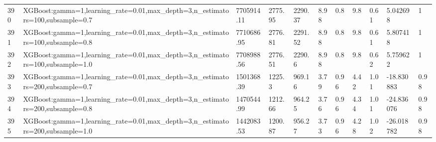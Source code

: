 \begin{longtable}{C{0.8cm} L{2cm} C{1.15cm} C{1.15cm} C{1.15cm} C{1.15cm} C{0.85cm} C{1.25cm} C{1.2cm} C{1.5cm} C{1.0cm}}
390 & XGBoost:\newline gamma=1,\newline learning\_rate=0.01,\newline max\_depth=3,\newline n\_estimators=100,\newline subsample=0.7 & 7705914.11 & 2775.95 & 2290.37 & 8.98 & 0.8 & 9.8 & 0.61 & 5.042698 & 1 \\
391 & XGBoost:\newline gamma=1,\newline learning\_rate=0.01,\newline max\_depth=3,\newline n\_estimators=100,\newline subsample=0.8 & 7710686.95 & 2776.81 & 2291.52 & 8.98 & 0.8 & 9.8 & 0.61 & 5.807418 & 1 \\
392 & XGBoost:\newline gamma=1,\newline learning\_rate=0.01,\newline max\_depth=3,\newline n\_estimators=100,\newline subsample=1.0 & 7708988.56 & 2776.51 & 2290.6 & 8.98 & 0.8 & 9.8 & 0.62 & 5.759622 & 1 \\
393 & XGBoost:\newline gamma=1,\newline learning\_rate=0.01,\newline max\_depth=3,\newline n\_estimators=200,\newline subsample=0.7 & 1501368.39 & 1225.3 & 969.16 & 3.79 & 0.96 & 4.42 & 1.01 & -18.830883 & 0.98 \\
394 & XGBoost:\newline gamma=1,\newline learning\_rate=0.01,\newline max\_depth=3,\newline n\_estimators=200,\newline subsample=0.8 & 1470544.99 & 1212.66 & 964.25 & 3.76 & 0.96 & 4.34 & 1.01 & -24.836076 & 0.98 \\
395 & XGBoost:\newline gamma=1,\newline learning\_rate=0.01,\newline max\_depth=3,\newline n\_estimators=200,\newline subsample=1.0 & 1442083.53 & 1200.87 & 956.27 & 3.73 & 0.96 & 4.28 & 1.02 & -26.018782 & 0.98 \\

\end{longtable}
